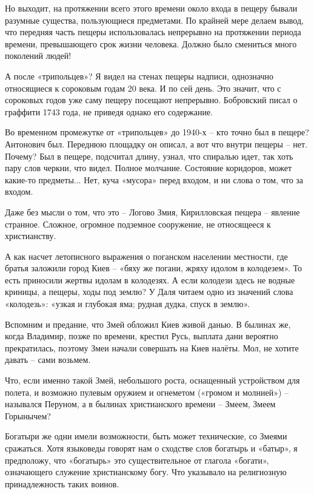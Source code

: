 Но выходит, на протяжении всего этого времени около входа в пещеру бывали разумные существа, пользующиеся предметами. По крайней мере делаем вывод, что передняя часть пещеры использовалась непрерывно на протяжении периода времени, превышающего срок жизни человека. Должно было смениться много поколений людей!

А после «трипольцев»? Я видел на стенах пещеры надписи, однозначно относящиеся к сороковым годам 20 века. И по сей день. Это значит, что с сороковых годов уже саму пещеру посещают непрерывно. Бобровский писал о граффити 1743 года, не приведя однако его содержание.

Во временном промежутке от «трипольцев» до 1940-х – кто точно был в пещере? Антонович был. Переднюю площадку он описал, а вот что внутри пещеры – нет. Почему? Был в пещере, подсчитал длину, узнал, что спиралью идет, так хоть пару слов черкни, что видел. Полное молчание. Состояние коридоров, может какие-то предметы... Нет, куча «мусора» перед входом, и ни слова о том, что за входом.

Даже без мысли о том, что это – Логово Змия, Кирилловская пещера – явление странное. Сложное, огромное подземное сооружение, не относящееся к христианству.

А как насчет летописного выражения о поганском населении местности, где братья заложили город Киев – «бяху же погани, жряху идолом в колодезем». То есть приносили жертвы идолам в колодезях. А если колодези здесь не водные криницы, а пещеры, ходы под землю? У Даля читаем одно из значений слова «колодезь»: «узкая и глубокая яма; рудная дудка, спуск в землю». 


Вспомним и предание, что Змей обложил Киев живой данью. В былинах же, когда Владимир, позже по времени, крестил Русь, выплата дани вероятно прекратилась, поэтому Змеи начали совершать на Киев налёты. Мол, не хотите давать – сами возьмем.

Что, если именно такой Змей, небольшого роста, оснащенный устройством для полета, и возможно пулевым оружием и огнеметом («громом и молнией») – назывался Перуном, а в былинах христианского времени – Змеем, Змеем Горынычем?

Богатыри же одни имели возможности, быть может технические, со Змеями сражаться. Хотя языковеды говорят нам о сходстве слов богатырь и «батыр», я предположу, что «богатырь» это существительное от глагола «богати», означающего служение христианскому богу. Что указывало на религиозную принадлежность таких воинов.

